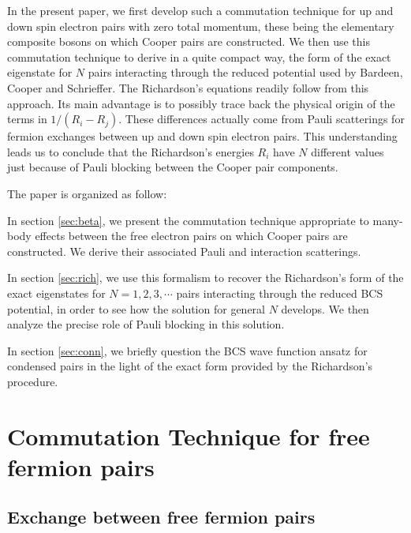 \documentclass[aps,prb,superscriptaddress,showpacs,reprint,lengthcheck]{revtex4-1}
\begin{document}
In the present paper, we first develop such a commutation technique for up and down spin
electron pairs with zero total momentum, these being the elementary composite bosons on which Cooper pairs are constructed. We then use this commutation technique to derive in a quite
compact way, the form of the exact eigenstate for $N$ pairs interacting
through the reduced potential used by Bardeen, Cooper and Schrieffer. The Richardson's equations readily follow
from this approach. Its main advantage is to possibly trace back the physical origin of the terms in $1/(R_i-R_j)$. These differences actually come
from Pauli scatterings for fermion exchanges 
between up and down spin electron pairs. This understanding leads us to conclude that 
the Richardson's energies $R_i$  have $N$ different values just because 
of Pauli blocking between the Cooper pair components.

The paper is organized as follow:

In section \ref{sec:beta}, we present the commutation technique  appropriate to many-body effects between the free
electron pairs on which Cooper pairs are constructed. We derive their associated Pauli and interaction scatterings.

In section \ref{sec:rich}, we use this formalism to recover the Richardson's form of the
exact eigenstates for $N=1,2,3,\cdots$ pairs interacting through the reduced
BCS potential, in order to see how the solution for general $N$ develops. We
then analyze the precise role of Pauli blocking in this solution.

In section \ref{sec:conn}, we briefly question the BCS wave function ansatz for condensed pairs in the light of the exact form provided by the Richardson's procedure.

\section{Commutation Technique for free fermion pairs\label{sec:beta}}

\subsection{Exchange between free fermion pairs}
\end{document}
